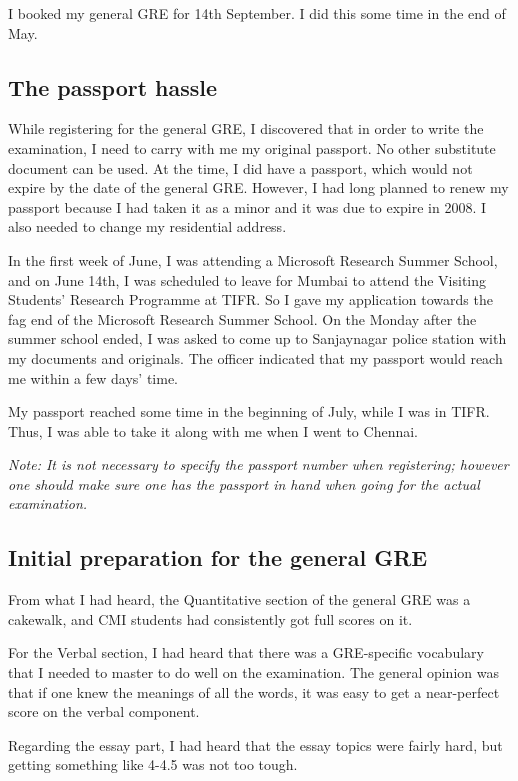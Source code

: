 \documentclass[a4paper]{amsart}
\begin{document}
I booked my general GRE for 14th September. I did this some time
in the end of May.

\subsection{The passport hassle}

While registering for the general GRE, I discovered that in order to
write the examination, I need to carry with me my original passport.
No other substitute document can be used. At the time, I did have a
passport, which would not expire by the date of the general GRE.
However, I had long planned to renew my passport because I had taken
it as a minor and it was due to expire in 2008. I also needed to change
my residential address.

In the first week of June, I was attending a Microsoft Research Summer
School, and on June 14th, I was scheduled to leave for Mumbai to
attend the Visiting Students' Research Programme at TIFR. So I gave my
application towards the fag end of the Microsoft Research Summer
School. On the Monday after the summer school ended, I was asked to
come up to Sanjaynagar police station with my documents and originals.
The officer indicated that my passport would reach me within a few
days' time.

My passport reached some time in the beginning of July, while I was in
TIFR. Thus, I was able to take it along with me when I went to Chennai.

{\em Note: It is not necessary to specify the passport number when
  registering; however one should make sure one has the passport in
  hand when going for the actual examination.}

\subsection{Initial preparation for the general GRE}

From what I had heard, the Quantitative section of the general GRE was
a cakewalk, and CMI students had consistently got full scores
on it. 

For the Verbal section, I had heard that there was a GRE-specific
vocabulary that I needed to master to do well on the examination. The
general opinion was that if one knew the meanings of all the words, it
was easy to get a near-perfect score on the verbal component.

Regarding the essay part, I had heard that the essay topics were fairly
hard, but getting something like 4-4.5 was not too tough.
\end{document}
